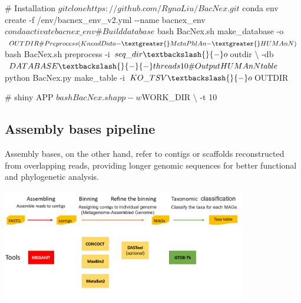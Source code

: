 \documentclass[
]{article}
\newenvironment{Shaded}{\begin{snugshade}}{\end{snugshade}}
\newcommand{\NormalTok}[1]{#1}
\begin{document}
\begin{Shaded}
\begin{Highlighting}[]
\NormalTok{\# Installation}
\NormalTok{$ git clone https://github.com/RynoLiu/BacNex.git}
\NormalTok{$ conda env create {-}f /env/bacnex\_env\_v2.yml {-}{-}name bacnex\_env}
\NormalTok{$ conda activate bacnex\_env}

\NormalTok{\# Build database}
\NormalTok{$ bash BacNex.sh make\_database {-}o $OUTDIR}

\NormalTok{\# Preprocess (KneadData {-}\textgreater{} MetaPhlAn {-}\textgreater{} HUMAnN)}
\NormalTok{$ bash BacNex.sh preprocess {-}i $seq\_dir \textbackslash{}}
\NormalTok{                            {-}o $outdir \textbackslash{}}
\NormalTok{                            {-}db $DATABASE \textbackslash{}}
\NormalTok{                            {-}{-}threads 10}

\NormalTok{\# Output HUMAnN table}
\NormalTok{$ python BacNex.py make\_table {-}i $KO\_TSV \textbackslash{}}
\NormalTok{                              {-}o $OUTDIR}

\NormalTok{\# shiny APP}
\NormalTok{$ bash BacNex.sh app {-}w $WORK\_DIR \textbackslash{}}
\NormalTok{                     {-}t 10}
\end{Highlighting}
\end{Shaded}

\begin{Shaded}
\end{Shaded}

\hypertarget{assembly-bases-pipeline}{%
\subsection{Assembly bases pipeline}\label{assembly-bases-pipeline}}

Assembly bases, on the other hand, refer to contigs or scaffolds
reconstructed from overlapping reads, providing longer genomic sequences
for better functional and phylogenetic analysis.

\includegraphics[width=0.8\textwidth,height=\textheight]{images/Fig17.png}
\end{document}
